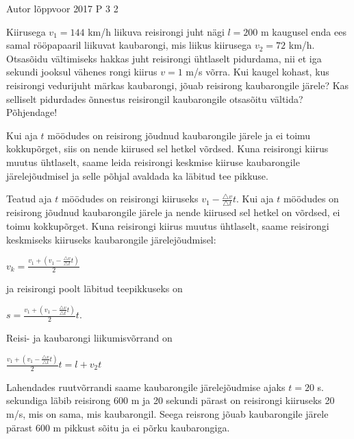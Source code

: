 {Autor} %
{lõppvoor} %
{2017} %
{P 3} %
{2} %
{

\ifStatement
Kiirusega $v_1 = 144$ km/h liikuva reisirongi juht nägi $l = 200$ m kaugusel enda ees samal rööpapaaril liikuvat kaubarongi, mis liikus kiirusega $v_2 = 72$ km/h. Otsasõidu vältimiseks hakkas juht reisirongi ühtlaselt pidurdama, nii et iga sekundi jooksul vähenes rongi kiirus $v = 1$ m/s võrra. Kui kaugel kohast, kus reisirongi vedurijuht märkas kaubarongi, jõuab reisirong kaubarongile järele? Kas selliselt pidurdades õnnestus reisirongil kaubarongile otsasõitu vältida? Põhjendage!
\fi


\ifHint
Kui aja $t$ möödudes on reisirong jõudnud kaubarongile järele ja ei toimu kokkupõrget, siis on nende kiirused sel hetkel võrdsed. Kuna reisirongi kiirus muutus ühtlaselt, saame leida reisirongi keskmise kiiruse kaubarongile järelejõudmisel ja selle põhjal avaldada ka läbitud tee pikkuse.
\fi

\ifSolution
Teatud aja $t$ möödudes on reisirongi kiiruseks $v_1 - \frac{\triangle v}{\triangle t} t$. Kui aja $t$ möödudes on reisirong jõudnud kaubarongile järele ja nende kiirused sel hetkel on võrdsed, ei toimu kokkupõrget. Kuna reisirongi kiirus muutus ühtlaselt, saame reisirongi keskmiseks kiiruseks kaubarongile järelejõudmisel:
\begin{center}
$v_k = \frac{v_1 + (v_1 - \frac{\triangle v}{\triangle t}t)}{2}$
\end{center}
ja reisirongi poolt läbitud teepikkuseks on
\begin{center}
$s = \frac{v_1 + (v_1 - \frac{\triangle v}{\triangle t}t)}{2} t$.
\end{center}
Reisi- ja kaubarongi liikumisvõrrand on
\begin{center}
$\frac{v_1 + (v_1 - \frac{\triangle v}{\triangle t}t)}{2}t = l + v_2 t$
\end{center}
Lahendades ruutvõrrandi saame kaubarongile järelejõudmise ajaks $t = 20$ s.
 sekundiga läbib reisirong 600 m ja 20 sekundi pärast on reisirongi
kiiruseks 20 m/s, mis on sama, mis kaubarongil.
\newline
Seega reisrong jõuab kaubarongile järele pärast 600 m pikkust sõitu ja
ei põrku kaubarongiga.
\fi
}